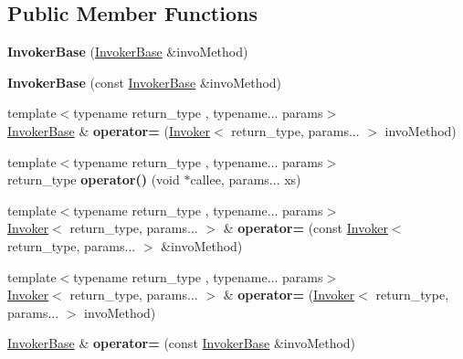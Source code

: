 \subsection*{Public Member Functions}
\begin{DoxyCompactItemize}
\item 
\mbox{\label{classcore_1_1_invoker_base_acaa5cea166578cc7bba04ae395168004}} 
{\bfseries Invoker\+Base} (\hyperlink{classcore_1_1_invoker_base}{Invoker\+Base} \&invo\+Method)
\item 
\mbox{\label{classcore_1_1_invoker_base_a4af10eb6aef42a0544fd53c9d57b6b6c}} 
{\bfseries Invoker\+Base} (const \hyperlink{classcore_1_1_invoker_base}{Invoker\+Base} \&invo\+Method)
\item 
\mbox{\label{classcore_1_1_invoker_base_a087544175e041a38cf15684d7eb2f23f}} 
{\footnotesize template$<$typename return\+\_\+type , typename... params$>$ }\\\hyperlink{classcore_1_1_invoker_base}{Invoker\+Base} \& {\bfseries operator=} (\hyperlink{classcore_1_1_invoker}{Invoker}$<$ return\+\_\+type, params... $>$ invo\+Method)
\item 
\mbox{\label{classcore_1_1_invoker_base_afc7fa6502d4297140cf8ab3408479c63}} 
{\footnotesize template$<$typename return\+\_\+type , typename... params$>$ }\\return\+\_\+type {\bfseries operator()} (void $\ast$callee, params... xs)
\item 
\mbox{\label{classcore_1_1_invoker_base_a2186a47cae984d9e43d3f2f7d2632301}} 
{\footnotesize template$<$typename return\+\_\+type , typename... params$>$ }\\\hyperlink{classcore_1_1_invoker}{Invoker}$<$ return\+\_\+type, params... $>$ \& {\bfseries operator=} (const \hyperlink{classcore_1_1_invoker}{Invoker}$<$ return\+\_\+type, params... $>$ \&invo\+Method)
\item 
\mbox{\label{classcore_1_1_invoker_base_a20d2a080ce9e7cb6a4b200179db33efd}} 
{\footnotesize template$<$typename return\+\_\+type , typename... params$>$ }\\\hyperlink{classcore_1_1_invoker}{Invoker}$<$ return\+\_\+type, params... $>$ \& {\bfseries operator=} (\hyperlink{classcore_1_1_invoker}{Invoker}$<$ return\+\_\+type, params... $>$ invo\+Method)
\item 
\mbox{\label{classcore_1_1_invoker_base_a218efa44504723e111ac82841445514e}} 
\hyperlink{classcore_1_1_invoker_base}{Invoker\+Base} \& {\bfseries operator=} (const \hyperlink{classcore_1_1_invoker_base}{Invoker\+Base} \&invo\+Method)
\end{DoxyCompactItemize}
